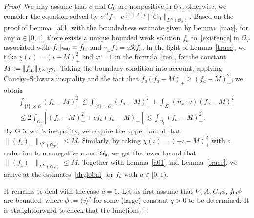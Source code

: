 \documentclass[AHL,Unicode,longabstracts,published]{cedram}
\newcommand*\fin {f_{\rm in}}
\newcommand*\RR {\mathcal{R}}
\newcommand*\OO {\mathcal{O}}
\newcommand{\la}{\langle}
\newcommand{\ra}{\rangle}
\begin{document}
\begin{proof}
We may assume that $c$ and $G_0$ are nonpositive in $\OO_T$; otherwise, we consider the equation solved by $e^{\Lambda t}f-e^{(1+\Lambda)t}\|G_0\|_{L^\infty(\OO_T)}$. Based on the proof of Lemma~\ref{a01} with the boundedness estimate given by Lemma~\ref{max}, for any $a\in[0,1)$, there exists a unique bounded weak solution $f_a$ to~\eqref{existence} in $\OO_T$ associated with $f_a|_{t=0}=\fin$ and $\gamma_-f_a=a\RR f_a$. In the light of Lemma~\ref{trace}, we take $\chi(\iota)=(\iota-M)_+^2$ and $\varphi=1$ in the formula~\eqref{ren}, for the constant $M:=\|\fin\|_{L^\infty(\OO)}$. Taking the boundary condition into account, applying Cauchy--Schwarz inequality and the fact that $f_a(f_a-M)_+\ge (f_a-M)_+^2$, we obtain
\begin{multline*}
\int_{\{t\}\,\times\,\OO} \left(f_a-M\right)_+^2
\le\int_{\{t\}\,\times\,\OO} \left(f_a-M\right)_+^2 + \int_{\Sigma_t}(n_x\cdot v)\left(f_a-M\right)_+^2\\
\le 2\int_{\OO_t} \left[\left(f_a-M\right)_+^2 + cf_a
\left(f_a-M\right)_+ \right]
\lesssim \int_{\OO_t} \left(f_a-M\right)_+^2.
\end{multline*}
By Gr\"onwall's inequality, we acquire the upper bound that $\|(f_a)_+\|_{L^\infty(\OO_T)}\le M$. Similarly, by taking $\chi(\iota)=(-\iota-M)_+^2$ with a reduction to nonnegative $c$ and $G_0$, we get the lower bound that $\|(f_a)_-\|_{L^\infty(\OO_T)}\le M$. Together with Lemma~\ref{a01} and Lemma~\ref{trace}, we arrive at the estimates~\eqref{drglobal} for $f_a$ with $a\in[0,1)$.

It remains to deal with the case $a=1$. Let us first assume that $\nabla_vA$, $G_0\phi$, $\fin\phi$ are bounded, where $\phi:=\la v\ra^q$ for some (large) constant $q>0$ to be determined. It is straightforward to check that the functions


\end{proof}
\end{document}
